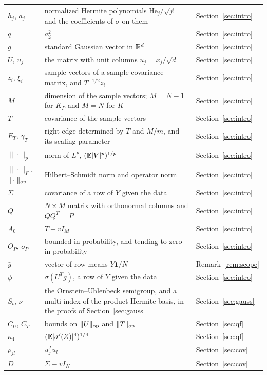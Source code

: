 {\begin{longtable}{@{}p{}p{}l@{}}
$h_j$, $a_j$ & normalized Hermite polynomials $\mathrm{He}_j/\sqrt{j!}$ and the coefficients of $\sigma$ on them & Section~\ref{sec:intro} \\
$q$ & $a_2^2$ & Section~\ref{sec:intro} \\
$g$ & standard Gaussian vector in $\mathbb{R}^d$ & Section~\ref{sec:intro} \\
$U$, $u_j$ & the matrix with unit columns $u_j=x_j/\sqrt d$ & Section~\ref{sec:intro} \\
$z_i$, $\xi_i$ & sample vectors of a sample covariance matrix, and $T^{-1/2}z_i$ & Section~\ref{sec:intro} \\
$M$ & dimension of the sample vectors; $M=N-1$ for $K_P$ and $M=N$ for $K$ & Section~\ref{sec:intro} \\
$T$ & covariance of the sample vectors & Section~\ref{sec:intro} \\
$E_T$, $\gamma_T$ & right edge determined by $T$ and $M/m$, and its scaling parameter & Section~\ref{sec:intro} \\
$\|\cdot\|_p$ & norm of $L^p$, $(\mathbb{E}|V|^p)^{1/p}$ & Section~\ref{sec:intro} \\
$\|\cdot\|_F$, $\|\cdot\|_{\rm op}$ & Hilbert--Schmidt norm and operator norm & Section~\ref{sec:intro} \\
$\Sigma$ & covariance of a row of $Y$ given the data & Section~\ref{sec:intro} \\
$Q$ & $N\times M$ matrix with orthonormal columns and $QQ^{T}=P$ & Section~\ref{sec:intro} \\
$A_0$ & $T-vI_M$ & Section~\ref{sec:intro} \\
$O_P$, $o_P$ & bounded in probability, and tending to zero in probability & Section~\ref{sec:intro} \\
$\bar y$ & vector of row means $Y\mathbf 1/N$ & Remark~\ref{rem:scope} \\
$\phi$ & $\sigma(U^{T}g)$, a row of $Y$ given the data & Section~\ref{sec:intro} \\
$S_t$, $\nu$ & the Ornstein--Uhlenbeck semigroup, and a multi-index of the product Hermite basis, in the proofs of Section~\ref{sec:gauss} & Section~\ref{sec:gauss} \\
$C_U$, $C_T$ & bounds on $\|U\|_{\rm op}$ and $\|T\|_{\rm op}$ & Section~\ref{sec:qf} \\
$\kappa_4$ & $(\mathbb{E}|\sigma'(Z)|^4)^{1/4}$ & Section~\ref{sec:qf} \\
$\rho_{jl}$ & $u_j^{T}u_l$ & Section~\ref{sec:cov} \\
$D$ & $\Sigma-vI_N$ & Section~\ref{sec:cov} \\

\end{longtable}}
